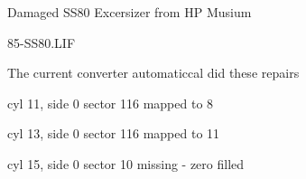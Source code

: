 \begin{DoxyItemize}
\begin{DoxyItemize}
\begin{DoxyItemize}
\item Damaged S\+S80 Excersizer from HP Musium
\end{DoxyItemize}
\item 85-\/\+S\+S80.\+L\+IF
\begin{DoxyItemize}
\item The current converter automaticcal did these repairs
\begin{DoxyItemize}
\item cyl 11, side 0 sector 116 mapped to 8
\item cyl 13, side 0 sector 116 mapped to 11
\item cyl 15, side 0 sector 10 missing -\/ zero filled
\end{DoxyItemize}
\end{DoxyItemize}
\end{DoxyItemize}
\end{DoxyItemize}

